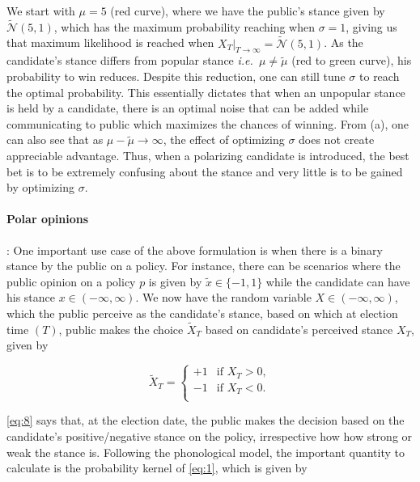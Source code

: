 \documentclass[aps,prl,twocolumn,showpacs,final]{revtex4-2}
\newcommand{\ie}{\textit{i.e.\ }}
\newcommand\at[2]{\left.#1\right|_{#2}}
\begin{document}
We start with $\mu=5$ (red curve), where we have the public's stance given by $\tilde{\mathcal{N}}(5,1)$, which has the maximum probability reaching when $\sigma=1$, giving us that maximum likelihood is reached when  $\at{X_T}{T\rightarrow\infty}=\tilde{\mathcal{N}}(5,1)$. As the candidate's stance differs from popular stance \ie $\mu\neq\tilde{\mu}$ (red to green curve), his probability to win reduces. Despite this reduction, one can still tune $\sigma$ to reach the optimal probability. This essentially dictates that when an unpopular stance is held by a candidate, there is an optimal noise that can be added while communicating to public which maximizes the chances of winning. From (a), one can also see that as $\mu-\tilde{\mu}\rightarrow\infty$, the effect of optimizing $\sigma$ does not create appreciable advantage. Thus, when a polarizing candidate is introduced, the best bet is to be extremely confusing about the stance and very little is to be gained by optimizing $\sigma$. 

\paragraph*{Polar opinions}: One important use case of the above formulation is when there is a binary stance by the public on a policy. For instance, there can be scenarios where the public opinion on a policy $p$ is given by $\tilde{x} \in \{-1,1\}$ while the candidate can have his stance $x \in (-\infty,\infty)$. We now have the random variable $X\in (-\infty,\infty)$, which the public perceive as the candidate's stance, based on which at election time $(T)$, public makes the choice $\tilde{X}_T$ based on candidate's perceived stance $X_T$, given by


\begin{equation}
    \tilde{X}_T = \begin{cases}
              +1 & \text{if } X_T> 0,\\
              -1 & \text{if } X_T< 0.\\
          \end{cases}\label{eq:8}
\end{equation}

\autoref{eq:8} says that, at the election date, the public makes the decision based on the candidate's  positive/negative stance on the policy, irrespective how how strong or weak the stance is. Following the phonological model, the important quantity to calculate is the probability kernel of \eqref{eq:1}, which is given by 
\end{document}
